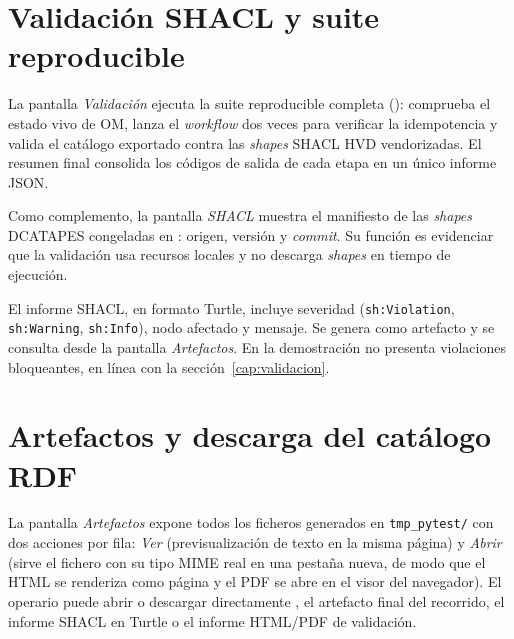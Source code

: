 
\section{Validación SHACL y suite reproducible}\label{sec:demo-validacion}

La pantalla \emph{Validación} ejecuta la suite reproducible completa (): comprueba el estado vivo de \ac{OM}, lanza el \emph{workflow} dos veces para verificar la idempotencia y valida el catálogo exportado contra las \emph{shapes} \ac{SHACL} \ac{HVD} vendorizadas. El resumen final consolida los códigos de salida de cada etapa en un único informe \ac{JSON}.


Como complemento, la pantalla \emph{SHACL} muestra el manifiesto de las
\emph{shapes} \ac{DCATAPES} congeladas en :
origen, versión y \emph{commit}. Su función es evidenciar que la validación usa
recursos locales y no descarga \emph{shapes} en tiempo de ejecución.

\begingroup
{}
El informe \ac{SHACL}, en formato Turtle, incluye severidad
(\texttt{sh:Violation}, \texttt{sh:Warning}, \texttt{sh:Info}), nodo afectado y
mensaje. Se genera como artefacto  y se consulta desde
la pantalla \emph{Artefactos}. En la demostración no presenta violaciones
bloqueantes, en línea con la sección~\ref{cap:validacion}.
\par
\endgroup


\section{Artefactos y descarga del catálogo RDF}\label{sec:demo-artefactos}

La pantalla \emph{Artefactos} expone todos los ficheros generados en \texttt{tmp\_pytest/} con dos acciones por fila: \emph{Ver} (previsualización de texto en la misma página) y \emph{Abrir} (sirve el fichero con su tipo \ac{MIME} real en una pestaña nueva, de modo que el HTML se renderiza como página y el PDF se abre en el visor del navegador). El operario puede abrir o descargar directamente , el artefacto final del recorrido, el informe \ac{SHACL} en Turtle o el informe HTML/PDF de validación.

